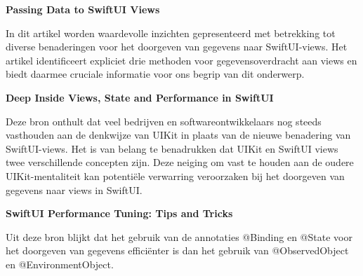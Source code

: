 
\textbf{Passing Data to SwiftUI Views~\autocite{SwiftDevJournal}}

In dit artikel worden waardevolle inzichten gepresenteerd met betrekking tot diverse benaderingen voor het doorgeven van gegevens naar SwiftUI-views. Het artikel identificeert expliciet drie methoden voor gegevensoverdracht aan views en biedt daarmee cruciale informatie voor ons begrip van dit onderwerp.

\textbf{Deep Inside Views, State and Performance in SwiftUI~\autocite{Long2020}}

Deze bron onthult dat veel bedrijven en softwareontwikkelaars nog steeds vasthouden aan de denkwijze van UIKit in plaats van de nieuwe benadering van SwiftUI-views. Het is van belang te benadrukken dat UIKit en SwiftUI views twee verschillende concepten zijn. Deze neiging om vast te houden aan de oudere UIKit-mentaliteit kan potentiële verwarring veroorzaken bij het doorgeven van gegevens naar views in SwiftUI.

\textbf{SwiftUI Performance Tuning: Tips and Tricks\newline ~\autocite{Amisha2022}}

Uit deze bron blijkt dat het gebruik van de annotaties @Binding en @State voor het doorgeven van gegevens efficiënter is dan het gebruik van @ObservedObject en @EnvironmentObject.


